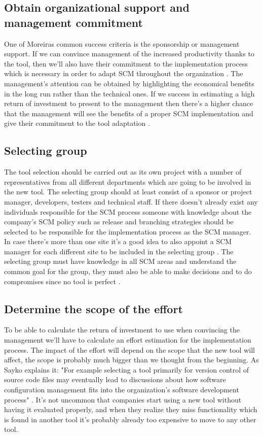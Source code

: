 \documentclass[10pt]{article}
\begin{document}
\subsection{Obtain organizational support and management commitment}
One of Moreiras \cite{Moreira} common success criteria is the sponsorship or management support. If we can convince management of the increased productivity thanks to the tool, then we'll also have their commitment to the implementation process which is necessary in order to adapt SCM throughout the organization \cite{Sayko}. The management's attention can be obtained by highlighting the economical benefits in the long run rather than the technical ones. If we success in estimating a high return of investment to present to the management then there's a higher chance that the management will see the benefits of a proper SCM implementation and give their commitment to the tool adaptation \cite{Sayko}. 

\subsection{Selecting group}
The tool selection should be carried out as its own project with a number of representatives from all different departments which are going to be involved in the new tool. The selecting group should at least consist of a sponsor or project manager, developers, testers and technical staff\cite{Sayko}. If there doesn't already exist any individuals responsible for the SCM process someone with knowledge about the company's SCM policy such as release and branching strategies should be selected to be responsible for the implementation process as the SCM manager. In case there's more than one site it's a good idea to also appoint a SCM manager for each different site to be included in the selecting group \cite{ABB}. The selecting group must have knowledge in all SCM areas and understand the common goal for the group, they must also be able to make decisions and to do compromises since no tool is perfect \cite{Sayko}.

\subsection{Determine the scope of the effort}
To be able to calculate the return of investment to use when convincing the management we'll have to calculate an effort estimation for the implementation process. The impact of the effort will depend on the scope that the new tool will affect, the scope is probably much bigger than we thought from the beginning. As Sayko explains it: "For example selecting a tool primarily for version control of source code files may eventually lead to discussions about how software configuration management fits into the organization's software development process" \cite{Sayko}. It's not uncommon that companies start using a new tool without having it evaluated properly, and when they realize they miss functionality which is found in another tool it's probably already too expensive to move to any other tool.
\end{document}
